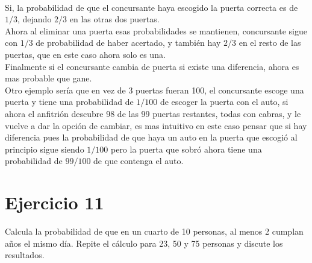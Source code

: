 \documentclass[12pt]{article}
\begin{document}
\paragraph{} Si, la probabilidad de que el concursante haya escogido la puerta correcta es de $1/3$, dejando $2/3$ en las otras dos puertas.\\ Ahora al eliminar una puerta esas probabilidades se mantienen, concursante sigue con $1/3$ de probabilidad de haber acertado, y también hay $2/3$ en el resto de las puertas, que en este caso ahora solo es una.\\
Finalmente si el concursante cambia de puerta si existe una diferencia, ahora es mas probable que gane.\\
Otro ejemplo sería que en vez de 3 puertas fueran 100, el concursante escoge una puerta y tiene una probabilidad de $1/100$ de escoger la puerta con el auto, si ahora el anfitrión descubre 98 de las 99 puertas restantes, todas con cabras, y le vuelve a dar la opción de cambiar, es mas intuitivo en este caso pensar que si hay diferencia pues la probabilidad de que haya un auto en la puerta que escogió al principio sigue siendo $1/100$ pero la puerta que sobró ahora tiene una probabilidad de $99/100$ de que contenga el auto.
\section{Ejercicio 11}
Calcula la probabilidad de que en un cuarto de 10 personas, al menos 2 cumplan años el
mismo día. Repite el cálculo para 23, 50 y 75 personas y discute los resultados.
\end{document}
